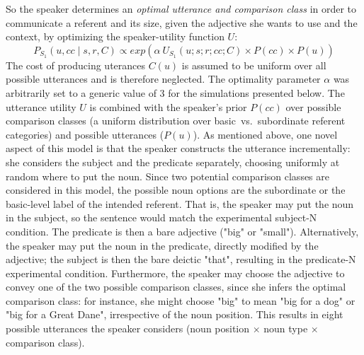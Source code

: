 So the speaker determines an \emph{optimal utterance and comparison class} in order to communicate a referent and its size, given the adjective she wants to use and the context, by optimizing the speaker-utility function $U$:
\begin{equation}
P_{S_1} (u, cc \mid s, r, C)  \propto exp(\alpha \: U_{S_1}(u; s; r; cc; C) \times P(cc) \times P(u)) 
\end{equation}
The cost of producing uterances $C(u)$ is assumed to be uniform over all possible utterances and is therefore neglected. The optimality parameter $\alpha$ was arbitrarily set to a generic value of 3 for the simulations presented below. The utterance utility $U$ is combined with the speaker's prior $P(cc)$ over possible comparison classes (a uniform distribution over basic~vs.~subordinate referent categories) and possible utterances ($P(u)$).
As mentioned above, one novel aspect of this model is that the speaker constructs the utterance incrementally: she considers the subject and the predicate separately, choosing uniformly at random where to put the noun. Since two potential comparison classes are considered in this model, the possible noun options are the subordinate or the basic-level label of the intended referent. That is, the speaker may put the noun in the subject, so the sentence would match the experimental subject-N condition. The predicate is then a bare adjective ("big" or "small"). Alternatively, the speaker may put the noun in the predicate, directly modified by the adjective; the subject is then the bare deictic "that", resulting in the predicate-N experimental condition. Furthermore, the speaker may choose the adjective to convey one of the two possible comparison classes, since she infers the optimal comparison class: for instance, she might choose "big" to mean "big for a dog" or "big for a Great Dane", irrespective of the noun position. This results in eight possible utterances the speaker considers (noun position $\times$ noun type $\times$ comparison class).  

